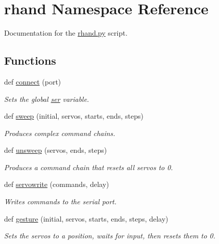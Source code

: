 \hypertarget{namespacerhand}{}\section{rhand Namespace Reference}
\label{namespacerhand}


Documentation for the \hyperlink{rhand_8py_source}{rhand.\+py} script.  


\subsection*{Functions}
\begin{DoxyCompactItemize}
\item 
def \hyperlink{namespacerhand_ab6cfbdf7ca3e2e337ab0c5f9ee95760f}{connect} (port)
\begin{DoxyCompactList}\small\item\em Sets the global \hyperlink{namespacerhand_a55075d70ccd56b9f3addb4dec3331b32}{ser} variable. \end{DoxyCompactList}\item 
def \hyperlink{namespacerhand_a2e8c6700bc1459e613d6909c647923df}{sweep} (initial, servos, starts, ends, steps)
\begin{DoxyCompactList}\small\item\em Produces complex command chains. \end{DoxyCompactList}\item 
def \hyperlink{namespacerhand_acea83c4df9b096167d16067c51884efd}{unsweep} (servos, ends, steps)
\begin{DoxyCompactList}\small\item\em Produces a command chain that resets all servos to 0. \end{DoxyCompactList}\item 
def \hyperlink{namespacerhand_a28d7482a563e91bdba673ac765bc3eaf}{servowrite} (commands, delay)
\begin{DoxyCompactList}\small\item\em Writes commands to the serial port. \end{DoxyCompactList}\item 
def \hyperlink{namespacerhand_a50969ad88498680f18ff3f418a9f5605}{gesture} (initial, servos, starts, ends, steps, delay)
\begin{DoxyCompactList}\small\item\em Sets the servos to a position, waits for input, then resets them to 0. \end{DoxyCompactList}\item 

\end{DoxyCompactItemize}
